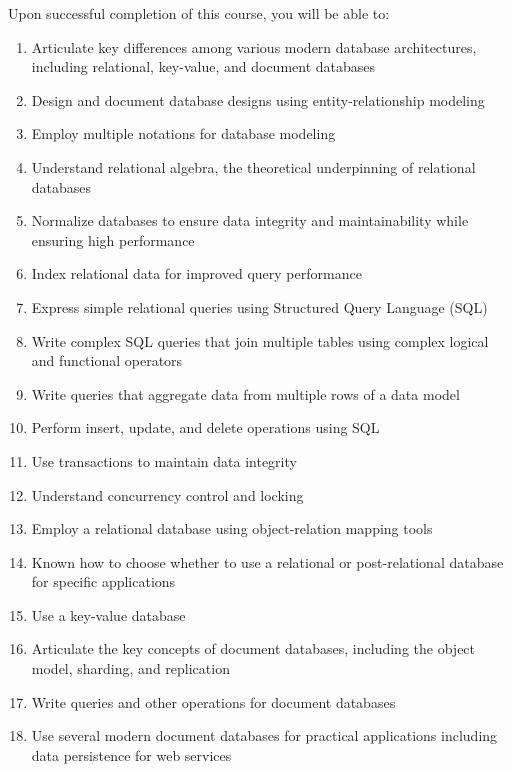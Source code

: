 \documentclass[11pt]{article}
\begin{document}
Upon successful completion of this course,
you will be able to:
\begin{enumerate}
\item Articulate key differences among various modern database architectures,
  including relational, key-value, and document databases
\item Design and document database designs using entity-relationship modeling
\item Employ multiple notations for database modeling
\item Understand relational algebra,
  the theoretical underpinning of relational databases
\item Normalize databases to ensure data integrity and maintainability
  while ensuring high performance
\item Index relational data for improved query performance
\item Express simple relational queries using Structured Query Language (SQL)
\item Write complex SQL queries
  that join multiple tables
  using complex logical and functional operators
\item Write queries that aggregate data from multiple rows of a data model
\item Perform insert, update, and delete operations using SQL
\item Use transactions to maintain data integrity
\item Understand concurrency control and locking
\item Employ a relational database using object-relation mapping tools
\item Known how to choose whether to use a relational or post-relational
  database for specific applications
\item Use a key-value database
\item Articulate the key concepts of document databases,
  including the object model, sharding, and replication
\item Write queries and other operations for document databases
\item Use several modern document databases for practical applications
  including data persistence for web services
\end{enumerate}

\end{document}
